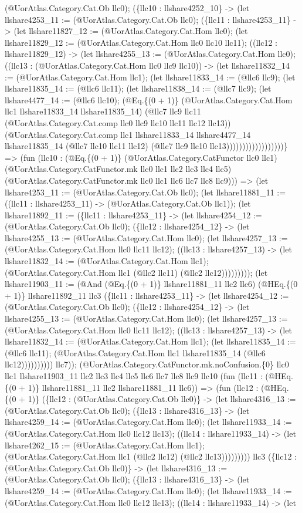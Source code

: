 \documentclass[11pt]{article}
\begin{document}
(@UorAtlas.Category.Cat.Ob llc0); (\{llc10 : llshare4252\_10\} -> (let llshare4253\_11 := (@UorAtlas.Category.Cat.Ob llc0); (\{llc11 : llshare4253\_11\} -> (let llshare11827\_12 := (@UorAtlas.Category.Cat.Hom llc0); (let llshare11829\_12 := (@UorAtlas.Category.Cat.Hom llc0 llc10 llc11); ((llc12 : llshare11829\_12) -> (let llshare4255\_13 := (@UorAtlas.Category.Cat.Hom llc0); ((llc13 : (@UorAtlas.Category.Cat.Hom llc0 llc9 llc10)) -> (let llshare11832\_14 := (@UorAtlas.Category.Cat.Hom llc1); (let llshare11833\_14 := (@llc6 llc9); (let llshare11835\_14 := (@llc6 llc11); (let llshare11838\_14 := (@llc7 llc9); (let llshare4477\_14 := (@llc6 llc10); (@Eq.\{(0 + 1)\} (@UorAtlas.Category.Cat.Hom llc1 llshare11833\_14 llshare11835\_14) (@llc7 llc9 llc11 (@UorAtlas.Category.Cat.comp llc0 llc9 llc10 llc11 llc12 llc13)) (@UorAtlas.Category.Cat.comp llc1 llshare11833\_14 llshare4477\_14 llshare11835\_14 (@llc7 llc10 llc11 llc12) (@llc7 llc9 llc10 llc13))))))))))))))))))\} => (fun (llc10 : (@Eq.\{(0 + 1)\} (@UorAtlas.Category.CatFunctor llc0 llc1) (@UorAtlas.Category.CatFunctor.mk llc0 llc1 llc2 llc3 llc4 llc5) (@UorAtlas.Category.CatFunctor.mk llc0 llc1 llc6 llc7 llc8 llc9))) => (let llshare4253\_11 := (@UorAtlas.Category.Cat.Ob llc0); (let llshare11881\_11 := ((llc11 : llshare4253\_11) -> (@UorAtlas.Category.Cat.Ob llc1)); (let llshare11892\_11 := (\{llc11 : llshare4253\_11\} -> (let llshare4254\_12 := (@UorAtlas.Category.Cat.Ob llc0); (\{llc12 : llshare4254\_12\} -> (let llshare4255\_13 := (@UorAtlas.Category.Cat.Hom llc0); (let llshare4257\_13 := (@UorAtlas.Category.Cat.Hom llc0 llc11 llc12); ((llc13 : llshare4257\_13) -> (let llshare11832\_14 := (@UorAtlas.Category.Cat.Hom llc1); (@UorAtlas.Category.Cat.Hom llc1 (@llc2 llc11) (@llc2 llc12))))))))); (let llshare11903\_11 := (@And (@Eq.\{(0 + 1)\} llshare11881\_11 llc2 llc6) (@HEq.\{(0 + 1)\} llshare11892\_11 llc3 (\{llc11 : llshare4253\_11\} -> (let llshare4254\_12 := (@UorAtlas.Category.Cat.Ob llc0); (\{llc12 : llshare4254\_12\} -> (let llshare4255\_13 := (@UorAtlas.Category.Cat.Hom llc0); (let llshare4257\_13 := (@UorAtlas.Category.Cat.Hom llc0 llc11 llc12); ((llc13 : llshare4257\_13) -> (let llshare11832\_14 := (@UorAtlas.Category.Cat.Hom llc1); (let llshare11835\_14 := (@llc6 llc11); (@UorAtlas.Category.Cat.Hom llc1 llshare11835\_14 (@llc6 llc12)))))))))) llc7)); (@UorAtlas.Category.CatFunctor.mk.noConfusion.\{0\} llc0 llc1 llshare11903\_11 llc2 llc3 llc4 llc5 llc6 llc7 llc8 llc9 llc10 (fun (llc11 : (@HEq.\{(0 + 1)\} llshare11881\_11 llc2 llshare11881\_11 llc6)) => (fun (llc12 : (@HEq.\{(0 + 1)\} (\{llc12 : (@UorAtlas.Category.Cat.Ob llc0)\} -> (let llshare4316\_13 := (@UorAtlas.Category.Cat.Ob llc0); (\{llc13 : llshare4316\_13\} -> (let llshare4259\_14 := (@UorAtlas.Category.Cat.Hom llc0); (let llshare11933\_14 := (@UorAtlas.Category.Cat.Hom llc0 llc12 llc13); ((llc14 : llshare11933\_14) -> (let llshare4262\_15 := (@UorAtlas.Category.Cat.Hom llc1); (@UorAtlas.Category.Cat.Hom llc1 (@llc2 llc12) (@llc2 llc13))))))))) llc3 (\{llc12 : (@UorAtlas.Category.Cat.Ob llc0)\} -> (let llshare4316\_13 := (@UorAtlas.Category.Cat.Ob llc0); (\{llc13 : llshare4316\_13\} -> (let llshare4259\_14 := (@UorAtlas.Category.Cat.Hom llc0); (let llshare11933\_14 := (@UorAtlas.Category.Cat.Hom llc0 llc12 llc13); ((llc14 : llshare11933\_14) -> (let 
\end{document}
